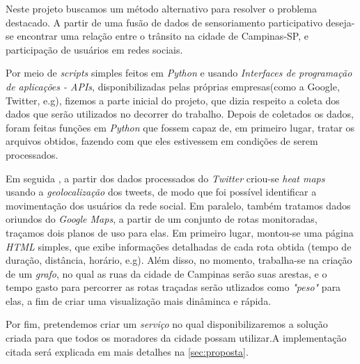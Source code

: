 Neste projeto buscamos um método alternativo para resolver o problema destacado. A partir de uma fusão de dados de sensoriamento participativo deseja-se encontrar uma relação entre o trânsito na cidade de Campinas-SP, e participação de usuários em redes sociais. 

Por meio de \emph{scripts} simples feitos em \emph{Python} e usando \emph{Interfaces de programação de aplicações - APIs}, disponibilizadas pelas próprias empresas(como a Google, Twitter, e.g), fizemos a parte inicial do projeto, que dizia respeito a coleta dos dados que serão utilizados no decorrer do trabalho. Depois de coletados os dados, foram feitas funções em \emph{Python} que fossem capaz de, em primeiro lugar, tratar os arquivos obtidos, fazendo com que eles estivessem em condições de serem processados. 

Em seguida , a partir dos dados processados do \emph{Twitter} criou-se \emph{heat maps} usando a \emph{geolocalização} dos tweets, de modo que foi possível identificar a movimentação dos usuários da rede social. Em paralelo, também tratamos dados oriundos do \emph{Google Maps}, a partir de um conjunto de rotas monitoradas, traçamos dois planos de uso para elas. Em primeiro lugar, montou-se uma página \emph{HTML} simples, que exibe informações detalhadas de cada rota obtida (tempo de duração, distância, horário, e.g). Além disso, no momento, trabalha-se na criação de um \emph{grafo}, no qual as ruas da cidade de Campinas serão suas arestas, e o tempo gasto para percorrer as rotas traçadas serão utlizados como \emph{"peso"} para elas, a fim de criar uma visualização mais dinâminca e rápida.

Por fim, pretendemos criar um \emph{serviço} no qual disponibilizaremos a solução criada para que todos os moradores da cidade possam utilizar.A implementação citada será explicada em mais detalhes na \autoref{sec:proposta}.